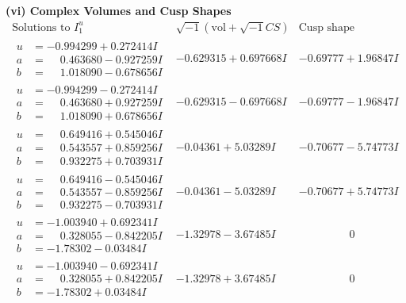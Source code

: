 \documentclass[1p]{elsarticle_modified}
\theoremstyle{definition}
\newcommand{\I}{\sqrt{-1}}
\begin{document}
\newpage\flushleft \textbf{(vi) Complex Volumes and Cusp Shapes}
$$\begin{array}{c|c|c}  
\text{Solutions to }I^u_{1}& \I (\text{vol} + \sqrt{-1}CS) & \text{Cusp shape}\\
 \hline 
\begin{aligned}
u &= -0.994299 + 0.272414 I \\
a &= \phantom{-}0.463680 - 0.927259 I \\
b &= \phantom{-}1.018090 - 0.678656 I\end{aligned}
 & -0.629315 + 0.697668 I & -0.69777 + 1.96847 I \\ \hline\begin{aligned}
u &= -0.994299 - 0.272414 I \\
a &= \phantom{-}0.463680 + 0.927259 I \\
b &= \phantom{-}1.018090 + 0.678656 I\end{aligned}
 & -0.629315 - 0.697668 I & -0.69777 - 1.96847 I \\ \hline\begin{aligned}
u &= \phantom{-}0.649416 + 0.545046 I \\
a &= \phantom{-}0.543557 + 0.859256 I \\
b &= \phantom{-}0.932275 + 0.703931 I\end{aligned}
 & -0.04361 + 5.03289 I & -0.70677 - 5.74773 I \\ \hline\begin{aligned}
u &= \phantom{-}0.649416 - 0.545046 I \\
a &= \phantom{-}0.543557 - 0.859256 I \\
b &= \phantom{-}0.932275 - 0.703931 I\end{aligned}
 & -0.04361 - 5.03289 I & -0.70677 + 5.74773 I \\ \hline\begin{aligned}
u &= -1.003940 + 0.692341 I \\
a &= \phantom{-}0.328055 - 0.842205 I \\
b &= -1.78302 - 0.03484 I\end{aligned}
 & -1.32978 - 3.67485 I & \phantom{-0.000000 } 0 \\ \hline\begin{aligned}
u &= -1.003940 - 0.692341 I \\
a &= \phantom{-}0.328055 + 0.842205 I \\
b &= -1.78302 + 0.03484 I\end{aligned}
 & -1.32978 + 3.67485 I & \phantom{-0.000000 } 0 \\ \hline\begin{aligned}

\end{aligned}
\end{array}$$
\end{document}
